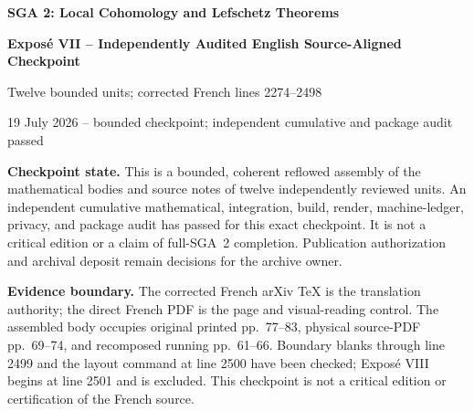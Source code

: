 \documentclass[11pt,a4paper]{article}
\begin{document}
\begin{center}
  {\LARGE\bfseries SGA 2: Local Cohomology and Lefschetz Theorems}\par\medskip
  {\Large\bfseries Expos\'e VII -- Independently Audited English Source-Aligned Checkpoint}\par\medskip
  {\normalsize Twelve bounded units; corrected French lines 2274--2498}\par
  {\small 19 July 2026 -- bounded checkpoint; independent cumulative and package audit passed}
\end{center}

\vspace{0.5\baselineskip}
\noindent\colorbox{softamber}{\parbox{0.94\linewidth}{\small
\textbf{Checkpoint state.} This is a bounded, coherent reflowed assembly of the
mathematical bodies and source notes of twelve independently reviewed units.
An independent cumulative mathematical, integration, build, render, machine-ledger,
privacy, and package audit has passed for this exact checkpoint. It is not a
critical edition or a claim of full-SGA~2 completion. Publication authorization
and archival deposit remain decisions for the archive owner.}}

\vspace{0.5\baselineskip}
\noindent\colorbox{softblue}{\parbox{0.94\linewidth}{\small
\textbf{Evidence boundary.} The corrected French arXiv TeX is the translation
authority; the direct French PDF is the page and visual-reading control. The
assembled body occupies original printed pp.~77--83, physical source-PDF
pp.~69--74, and recomposed running pp.~61--66. Boundary blanks through line
2499 and the layout command at line 2500 have been checked; Expos\'e VIII
begins at line 2501 and is excluded. This checkpoint is not a critical edition or
certification of the French source.}}
\end{document}

